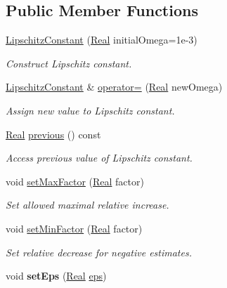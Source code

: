 \subsection*{\-Public \-Member \-Functions}
\begin{DoxyCompactItemize}
\item 
\hyperlink{classSpacy_1_1LipschitzConstant_aa260cc7420e3f5cfc7fe2d78fb2aa7ad}{\-Lipschitz\-Constant} (\hyperlink{classSpacy_1_1Real}{\-Real} initial\-Omega=1e-\/3)
\begin{DoxyCompactList}\small\item\em \-Construct \-Lipschitz constant. \end{DoxyCompactList}\item 
\hyperlink{classSpacy_1_1LipschitzConstant}{\-Lipschitz\-Constant} \& \hyperlink{classSpacy_1_1LipschitzConstant_a7f5636d01898427c65555da9b55450dd}{operator=} (\hyperlink{classSpacy_1_1Real}{\-Real} new\-Omega)
\begin{DoxyCompactList}\small\item\em \-Assign new value to \-Lipschitz constant. \end{DoxyCompactList}\item 
\hyperlink{classSpacy_1_1Real}{\-Real} \hyperlink{classSpacy_1_1LipschitzConstant_a3a91ae4dea16ff7e83f1d51797145cbd}{previous} () const 
\begin{DoxyCompactList}\small\item\em \-Access previous value of \-Lipschitz constant. \end{DoxyCompactList}\item 
void \hyperlink{classSpacy_1_1LipschitzConstant_a5e4f00a4178814300de3f2a0ac391c1c}{set\-Max\-Factor} (\hyperlink{classSpacy_1_1Real}{\-Real} factor)
\begin{DoxyCompactList}\small\item\em \-Set allowed maximal relative increase. \end{DoxyCompactList}\item 
void \hyperlink{classSpacy_1_1LipschitzConstant_ac5dbb64f6535fe26b6f5e43c95d85282}{set\-Min\-Factor} (\hyperlink{classSpacy_1_1Real}{\-Real} factor)
\begin{DoxyCompactList}\small\item\em \-Set relative decrease for negative estimates. \end{DoxyCompactList}\item 
\hypertarget{classSpacy_1_1Mixin_1_1Eps_a6b4c38a60848c0ab665fb3a81e181786}{void {\bfseries set\-Eps} (\hyperlink{classSpacy_1_1Real}{\-Real} \hyperlink{classSpacy_1_1Mixin_1_1Eps_a812b99b0abc1d78a34b4114907f23f52}{eps})}\label{classSpacy_1_1Mixin_1_1Eps_a6b4c38a60848c0ab665fb3a81e181786}


\end{DoxyCompactItemize}
